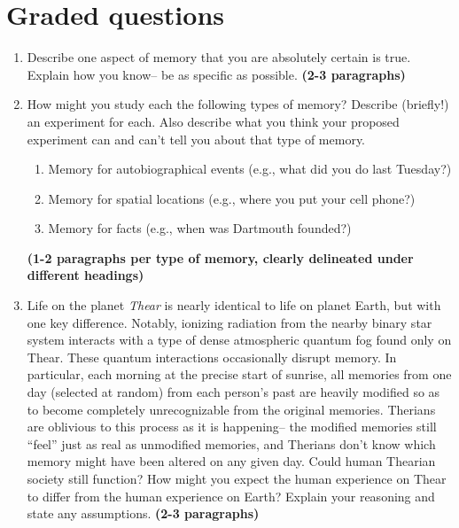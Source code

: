 \documentclass[11pt]{article}
\begin{document}
\section*{Graded questions}
\begin{enumerate}

\item Describe one aspect of memory that you are absolutely certain is
  true.  Explain how you know-- be as specific as possible.
  \textbf{(2-3 paragraphs)}

\item How might you study each the following types of
  memory?  Describe (briefly!) an experiment for each.  Also describe
  what you think your proposed experiment can and can't tell you about that
  type of memory.
  \begin{enumerate}
  \item Memory for autobiographical events (e.g., what did you do last Tuesday?)
    \item Memory for spatial locations (e.g., where you put your cell
      phone?)
      \item Memory for facts (e.g., when was Dartmouth founded?)
      \end{enumerate}
\textbf{(1-2 paragraphs per type of memory, clearly delineated under
  different headings)}

\item Life on the planet \textit{Thear} is nearly identical to life on
  planet Earth, but with one key difference.  Notably, ionizing
  radiation from the nearby binary star system interacts with a type
  of dense atmospheric quantum fog found only on Thear.  These quantum
  interactions occasionally disrupt memory.  In particular, each
  morning at the precise start of sunrise, all memories from one day
  (selected at random) from each person's past are heavily modified so
  as to become completely unrecognizable from the original memories.
  Therians are oblivious to this process as it is happening-- the
  modified memories still ``feel'' just as real as unmodified
  memories, and Therians don't know which memory might have been
  altered on any given day.  Could human Thearian society still
  function?  How might you expect the human experience on Thear to
  differ from the human experience on Earth?  Explain your reasoning
  and state any assumptions.  \textbf{(2-3 paragraphs)}
\end{enumerate}
\end{document}
